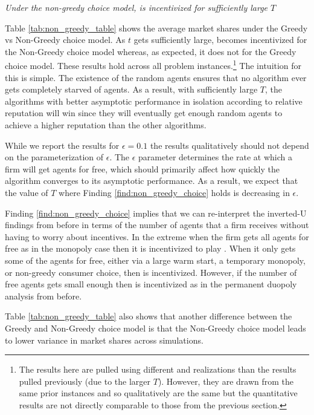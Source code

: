 \documentclass[../competing_bandits.tex]{subfiles}
\begin{document}
\normalsize


\begin{finding}\label{find:non_greedy_choice}
\textit{Under the non-greedy choice model, \TS is incentivized for sufficiently large $T$}
\end{finding}


Table \ref{tab:non_greedy_table} shows the average market shares under the Greedy vs Non-Greedy choice model. As $t$ gets sufficiently large, \TS becomes incentivized for the Non-Greedy choice model whereas, as expected, it does not for the Greedy choice model. These results hold across all problem instances.\footnote{The results here are pulled using different \MRV and realizations than the results pulled previously (due to the larger $T$). However, they are drawn from the same prior instances and so qualitatively are the same but the quantitative results are not directly comparable to those from the previous section.} The intuition for this is simple. The existence of the random agents ensures that no algorithm ever gets completely starved of agents. As a result, with sufficiently large $T$, the algorithms with better asymptotic performance in isolation according to relative reputation will win since they will eventually get enough random agents to achieve a higher reputation than the other algorithms.

While we report the results for $\epsilon = 0.1$ the results qualitatively should not depend on the parameterization of $\epsilon$. The $\epsilon$ parameter determines the rate at which a firm will get agents for free, which should primarily affect how quickly the algorithm converges to its asymptotic performance. As a result, we expect that the value of $T$ where Finding \ref{find:non_greedy_choice} holds is decreasing in $\epsilon$.

Finding \ref{find:non_greedy_choice} implies that we can re-interpret the inverted-U findings from before in terms of the number of agents that a firm receives without having to worry about incentives. In the extreme when the firm gets all agents for free as in the monopoly case then it is incentivized to play \DG. When it only gets some of the agents for free, either via a large warm start, a temporary monopoly, or non-greedy consumer choice, then \TS is incentivized. However, if the number of free agents gets small enough then \DG is incentivized as in the permanent duopoly analysis from before.

Table \ref{tab:non_greedy_table} also shows that another difference between the Greedy and Non-Greedy choice model is that the Non-Greedy choice model leads to lower variance in market shares across simulations.
\end{document}
